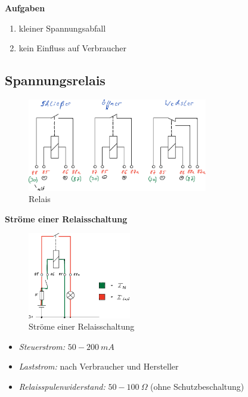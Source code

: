 \textbf{Aufgaben}

\begin{enumerate}
\item
  kleiner Spannungsabfall
\item
  kein Einfluss auf Verbraucher
\end{enumerate}

\subsection{Spannungsrelais}\label{spannungsrelais}

\begin{figure}[!ht]%
\centering
\includegraphics[width=0.7\textwidth]{images/Skizze/08_Relais_Skizze.pdf}
\caption{Relais}
\end{figure}

\textbf{Ströme einer Relaisschaltung}

\begin{figure}[!ht]%
\centering
\includegraphics[width=0.4\textwidth]{images/Skizze/09_Stroeme_einer_Relaisschaltung_Skizze.pdf}
\caption{Ströme einer Relaisschaltung}
\end{figure}

\begin{itemize}
\item
  \emph{Steuerstrom:} $50 - 200~mA$
\item
  \emph{Laststrom:} nach Verbraucher und Hersteller
\item
  \emph{Relaisspulenwiderstand:} $50 - 100~\Omega$ (ohne
  Schutzbeschaltung)
\end{itemize}

